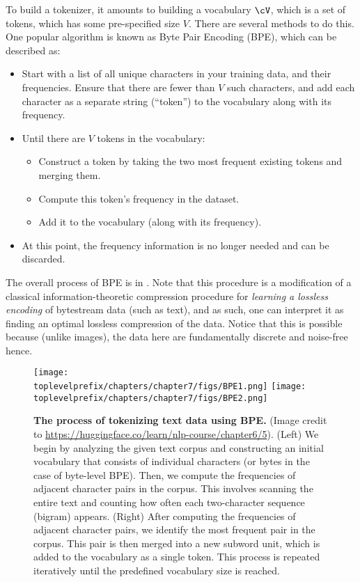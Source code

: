 \documentclass[../../book-main.tex]{subfiles}
\begin{document}
To build a tokenizer, it amounts to building a vocabulary \(\cV\), which is a set of tokens, which has some pre-specified size \(V\). There are several methods to do this. One popular algorithm is known as Byte Pair Encoding (BPE), which can be described as:
\begin{itemize}
    \item Start with a list of all unique characters in your training data, and their frequencies. Ensure that there are fewer than \(V\) such characters, and add each character as a separate string (``token'') to the vocabulary along with its frequency.
    \item Until there are \(V\) tokens in the vocabulary:
    \begin{itemize}
        \item Construct a token by taking the two most frequent existing tokens and merging them.
        \item Compute this token's frequency in the dataset.
        \item Add it to the vocabulary (along with its frequency).
    \end{itemize} 
    \item At this point, the frequency information is no longer needed and can be discarded.
\end{itemize}
The overall process of BPE is in . Note that this procedure is a modification of a classical information-theoretic compression procedure for \textit{learning a lossless encoding} of bytestream data (such as text), and as such, one can interpret it as finding an optimal lossless compression of the data. Notice that this is possible because (unlike images), the data here are fundamentally discrete and noise-free hence.
\begin{figure}
    \centering
    \texttt{[image: \\toplevelprefix/chapters/chapter7/figs/BPE1.png]}\hspace{0.6in} 
    \texttt{[image: \\toplevelprefix/chapters/chapter7/figs/BPE2.png]} 
    \caption{\small {\bf The process of tokenizing text data using BPE.} (Image credit to \url{https://huggingface.co/learn/nlp-course/chapter6/5}). (Left) We begin by analyzing the given text corpus and constructing an initial vocabulary that consists of individual characters (or bytes in the case of byte-level BPE). Then, we compute the frequencies of adjacent character pairs in the corpus. This involves scanning the entire text and counting how often each two-character sequence (bigram) appears. (Right) After computing the frequencies of adjacent character pairs, we identify the most frequent pair in the corpus. This pair is then merged into a new subword unit, which is added to the vocabulary as a single token. This process is repeated iteratively until the predefined vocabulary size is reached. }
    \label{fig:BPE}
\end{figure}
\end{document}
